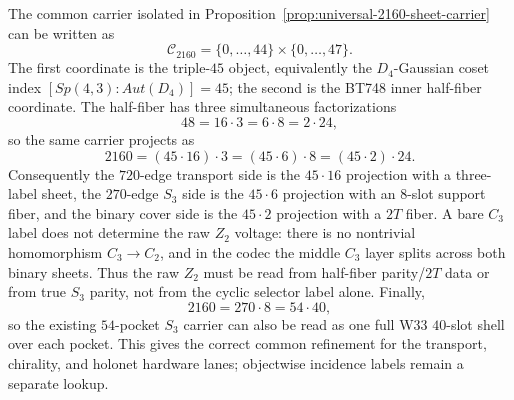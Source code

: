 
\makeatletter
{}
\makeatother
\providecommand{\PSp}{\mathrm{PSp}}
\providecommand{\Aut}{\mathrm{Aut}}
\providecommand{\spec}{\operatorname{spec}}


\begin{proposition}
\label{prop:universal-2160-projection-codec}
The common carrier isolated in Proposition~\ref{prop:universal-2160-sheet-carrier}
can be written as
\[
  \mathcal C_{2160}=\{0,\ldots,44\}\times\{0,\ldots,47\}.
\]
The first coordinate is the triple-$45$ object, equivalently the $D_4$-Gaussian
coset index $[Sp(4,3):Aut(D_4)]=45$; the second is the BT748 inner half-fiber
coordinate.  The half-fiber has three simultaneous factorizations
\[
  48=16\cdot3=6\cdot8=2\cdot24,
\]
so the same carrier projects as
\[
  2160=(45\cdot16)\cdot3=(45\cdot6)\cdot8=(45\cdot2)\cdot24.
\]
Consequently the $720$-edge transport side is the $45\cdot16$ projection with a
three-label sheet, the $270$-edge $S_3$ side is the $45\cdot6$ projection with an
$8$-slot support fiber, and the binary cover side is the $45\cdot2$ projection
with a $2T$ fiber.  A bare $C_3$ label does not determine the raw $Z_2$ voltage:
there is no nontrivial homomorphism $C_3\to C_2$, and in the codec the middle
$C_3$ layer splits across both binary sheets.  Thus the raw $Z_2$ must be read
from half-fiber parity/$2T$ data or from true $S_3$ parity, not from the cyclic
selector label alone.  Finally,
\[
  2160=270\cdot8=54\cdot40,
\]
so the existing $54$-pocket $S_3$ carrier can also be read as one full W33
$40$-slot shell over each pocket.  This gives the correct common refinement for
the transport, chirality, and holonet hardware lanes; objectwise incidence labels
remain a separate lookup.
\end{proposition}
